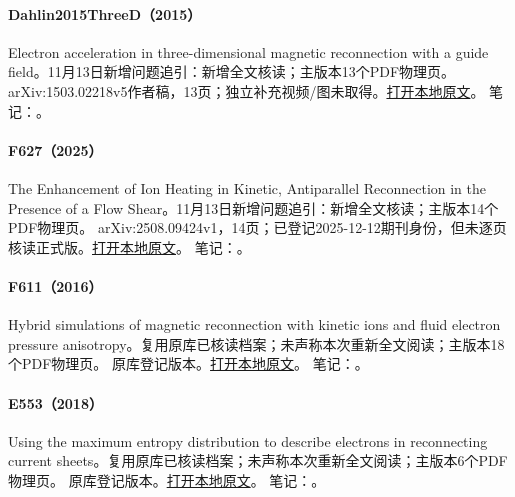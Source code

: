 \paragraph{Dahlin2015ThreeD（2015）}\label{paper:Dahlin2015ThreeD}
Electron acceleration in three-dimensional magnetic reconnection with a guide field。11月13日新增问题追引：新增全文核读；主版本13个PDF物理页。
arXiv:1503.02218v5作者稿，13页；独立补充视频/图未取得。\href{run:../../papers/Dahlin2015ThreeD.pdf}{打开本地原文}。
笔记：。\par\smallskip
\paragraph{F627（2025）}\label{paper:F627}
The Enhancement of Ion Heating in Kinetic, Antiparallel Reconnection in the Presence of a Flow Shear。11月13日新增问题追引：新增全文核读；主版本14个PDF物理页。
arXiv:2508.09424v1，14页；已登记2025-12-12期刊身份，但未逐页核读正式版。\href{run:../../papers/F627.pdf}{打开本地原文}。
笔记：。\par\smallskip
\paragraph{F611（2016）}\label{paper:F611}
Hybrid simulations of magnetic reconnection with kinetic ions and fluid electron pressure anisotropy。复用原库已核读档案；未声称本次重新全文阅读；主版本18个PDF物理页。
原库登记版本。\href{run:../../papers/F611.pdf}{打开本地原文}。
笔记：。\par\smallskip
\paragraph{E553（2018）}\label{paper:E553}
Using the maximum entropy distribution to describe electrons in reconnecting current sheets。复用原库已核读档案；未声称本次重新全文阅读；主版本6个PDF物理页。
原库登记版本。\href{run:../../papers/E553.pdf}{打开本地原文}。
笔记：。\par\smallskip
